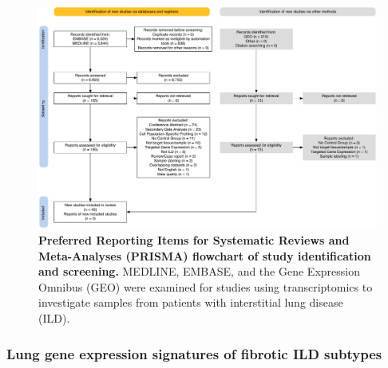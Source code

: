 \documentclass[
]{article}
\begin{document}
\begin{figure}

{\centering \includegraphics[width=0.9\linewidth,]{./Figures/SysReview/Figure1_Prisma} 

}

\caption[PRISMA screening]{\textbf{Preferred Reporting Items for Systematic Reviews and Meta-Analyses (PRISMA) flowchart of study identification and screening.} MEDLINE, EMBASE, and the Gene Expression Omnibus (GEO) were examined for studies using transcriptomics to investigate samples from patients with interstitial lung disease (ILD).}\label{fig:prisma}
\end{figure}

\hypertarget{lung-gene-expression-signatures-of-fibrotic-ild-subtypes}{%
\subsubsection{Lung gene expression signatures of fibrotic ILD subtypes}\label{lung-gene-expression-signatures-of-fibrotic-ild-subtypes}}
\end{document}
